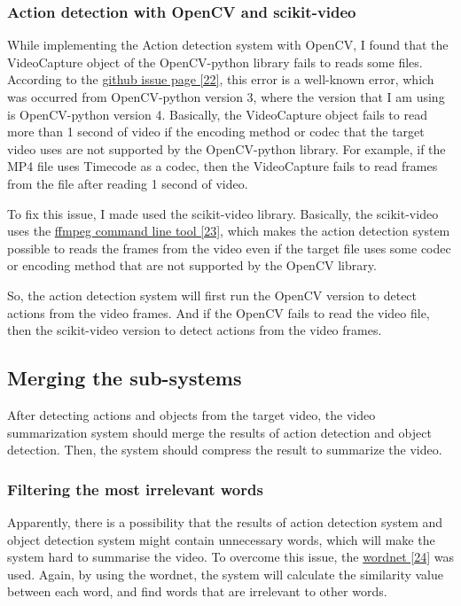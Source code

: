 \documentclass{article}
\begin{document}
\subsubsection{Action detection with OpenCV and scikit-video}

While implementing the Action detection system with OpenCV, I found that the VideoCapture object of the OpenCV-python library fails to reads some files. According to the \hyperlink{ref22}{github issue page [22]}, this error is a well-known error, which was occurred from OpenCV-python version 3, where the version that I am using is OpenCV-python version 4. Basically, the VideoCapture object fails to read more than 1 second of video if the encoding method or codec that the target video uses are not supported by the OpenCV-python library. For example, if the MP4 file uses Timecode as a codec, then the VideoCapture fails to read frames from the file after reading 1 second of video.

To fix this issue, I made used the scikit-video library. Basically, the scikit-video uses the \hyperlink{ref23}{ffmpeg command line tool [23]}, which makes the action detection system possible to reads the frames from the video even if the target file uses some codec or encoding method that are not supported by the OpenCV library.

So, the action detection system will first run the OpenCV version to detect actions from the video frames. And if the OpenCV fails to read the video file, then the scikit-video version to detect actions from the video frames.

\subsection{Merging the sub-systems}

After detecting actions and objects from the target video, the video summarization system should merge the results of action detection and object detection. Then, the system should compress the result to summarize the video.

\subsubsection{Filtering the most irrelevant words}

Apparently, there is a possibility that the results of action detection system and object detection system might contain unnecessary words, which will make the system hard to summarise the video. To overcome this issue, the \hyperlink{ref24}{wordnet [24]} was used. Again, by using the wordnet, the system will calculate the similarity value between each word, and find words that are irrelevant to other words.
\end{document}
